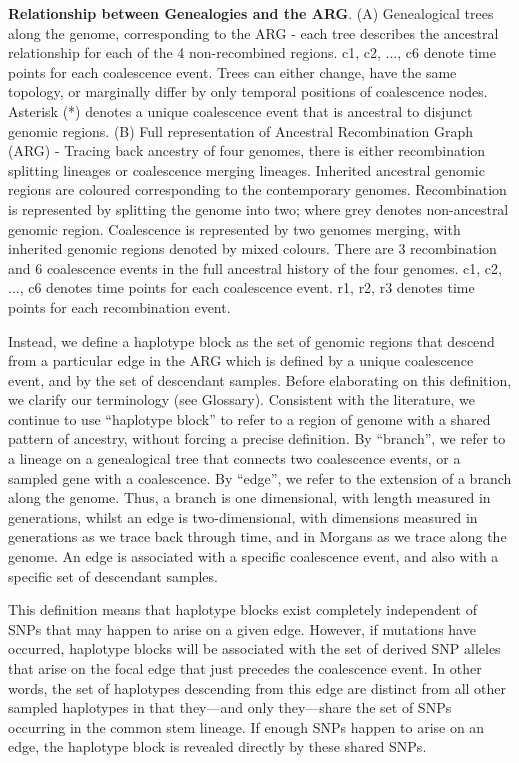 \documentclass[twocolumn]{bmcart}%
\begin{document}
\begin{tcolorbox}[
  colback=blue!5!white,width=\columnwidth,colframe=blue!50!black,title= Box 1: Ancestral Recombination Graph (ARG)]
{\textbf{Relationship between Genealogies and the ARG}. (A) Genealogical trees along the genome, corresponding to the ARG - each tree describes the ancestral relationship for each of the 4 non-recombined regions. c1, c2, ..., c6 denote time points for each coalescence event. Trees can either change, have the same topology, or marginally differ by only temporal positions of coalescence nodes. Asterisk (*) denotes a unique coalescence event that is ancestral to disjunct genomic regions. (B) Full representation of Ancestral Recombination Graph (ARG) - Tracing back ancestry of four genomes, there is either recombination splitting lineages or coalescence merging lineages. Inherited ancestral genomic regions are coloured corresponding to the contemporary genomes. Recombination is represented by splitting the genome into two; where grey denotes non-ancestral genomic region. Coalescence is represented by two genomes merging, with inherited genomic regions denoted by mixed colours. There are 3 recombination and 6 coalescence events in the full ancestral history of the four genomes. c1, c2, ..., c6 denotes time points for each coalescence event. r1, r2, r3 denotes time points for each recombination event.    \label{fig:2}}
\end{tcolorbox}

Instead, we define a haplotype block as the set of genomic regions that descend from a particular edge in the ARG which is defined by a unique coalescence event, and by the set of descendant samples.  Before elaborating on this definition, we clarify our terminology (see Glossary).  Consistent with the literature, we continue to use “haplotype block” to refer to a region of genome with a shared pattern of ancestry, without forcing a precise definition. By “branch”, we refer to a lineage on a genealogical tree that connects two coalescence events, or a sampled gene with a coalescence.  By “edge”, we refer to the extension of a branch along the genome.  Thus, a branch is one dimensional, with length measured in generations, whilst an edge is two-dimensional, with dimensions measured in generations as we trace back through time, and in Morgans as we trace along the genome.  An edge is associated with a specific coalescence event, and also with a specific set of descendant samples.

This definition means that haplotype blocks exist completely independent of SNPs that may happen to arise on a given edge. However, if mutations have occurred, haplotype blocks will be associated with the set of derived SNP alleles that arise on the focal edge that just precedes the coalescence event. In other words, the set of haplotypes descending from this edge are distinct from all other sampled haplotypes in that they—and only they—share the set of SNPs occurring in the common stem lineage. If enough SNPs happen to arise on an edge, the haplotype block is revealed directly by these shared SNPs.
\end{document}
